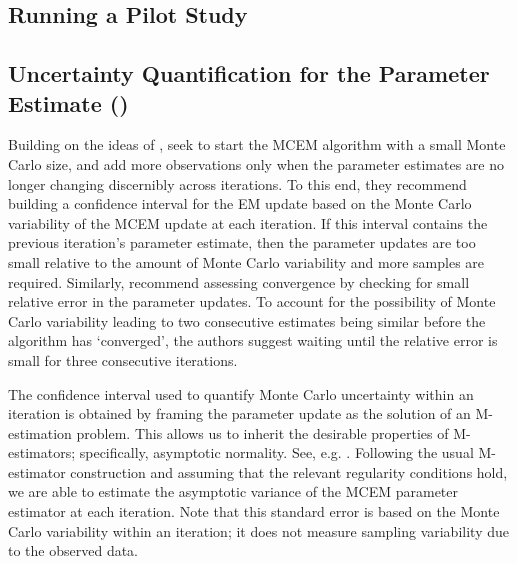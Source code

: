 \documentclass[11pt, oneside]{article}   	%
\begin{document}
\subsection{Running a Pilot Study}



\subsection{Uncertainty Quantification for the Parameter Estimate (\citealp{Boo99})}

Building on the ideas of \citeauthor{Wei90}, \citet{Boo99} seek to start the MCEM algorithm with a small Monte Carlo size, and add more observations only when the parameter estimates are no longer changing discernibly across iterations. To this end, they recommend building a confidence interval for the EM update based on the Monte Carlo variability of the MCEM update at each iteration. If this interval contains the previous iteration's parameter estimate, then the parameter updates are too small relative to the amount of Monte Carlo variability and more samples are required. Similarly, \citeauthor{Boo99} recommend assessing convergence by checking for small relative error in the parameter updates. To account for the possibility of Monte Carlo variability leading to two consecutive estimates being similar before the algorithm has `converged', the authors suggest waiting until the relative error is small for three consecutive iterations.

The confidence interval used to quantify Monte Carlo uncertainty within an iteration is obtained by framing the parameter update as the solution of an M-estimation problem. This allows us to inherit the desirable properties of M-estimators; specifically, asymptotic normality. See, e.g. \citet{van98}. Following the usual M-estimator construction and assuming that the relevant regularity conditions hold, we are able to estimate the asymptotic variance of the MCEM parameter estimator at each iteration. Note that this standard error is based on the Monte Carlo variability within an iteration; it does not measure sampling variability due to the observed data. 
\end{document}
